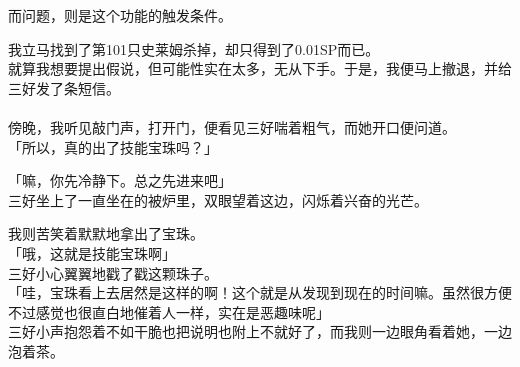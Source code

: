 而问题，则是这个功能的触发条件。

我立马找到了第101只史莱姆杀掉，却只得到了0.01SP而已。\\

就算我想要提出假说，但可能性实在太多，无从下手。于是，我便马上撤退，并给三好发了条短信。\\

\sqsplit\\

傍晚，我听见敲门声，打开门，便看见三好喘着粗气，而她开口便问道。\\

「所以，真的出了技能宝珠吗？」

「嘛，你先冷静下。总之先进来吧」\\

三好坐上了一直坐在的被炉里，双眼望着这边，闪烁着兴奋的光芒。

我则苦笑着默默地拿出了宝珠。\\

「哦，这就是技能宝珠啊」\\

三好小心翼翼地戳了戳这颗珠子。\\

「哇，宝珠看上去居然是这样的啊！这个就是从发现到现在的时间嘛。虽然很方便不过感觉也很直白地催着人一样，实在是恶趣味呢」\\

三好小声抱怨着不如干脆也把说明也附上不就好了，而我则一边眼角看着她，一边泡着茶。\\

